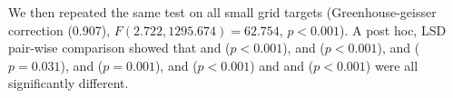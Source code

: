 We then repeated the same test on all small grid targets (Greenhouse-geisser correction (0.907), $F(2.722, 1295.674)=62.754$, $p<0.001$). A post hoc, LSD pair-wise comparison showed that \pinch and \swipe ($p<0.001$), \pinch and \throw ($p<0.001$), \pinch and \tilt ($p=0.031$), \swipe and \throw ($p=0.001$), \swipe and \tilt ($p<0.001$) and \throw and \tilt ($p<0.001$) were all significantly different. 